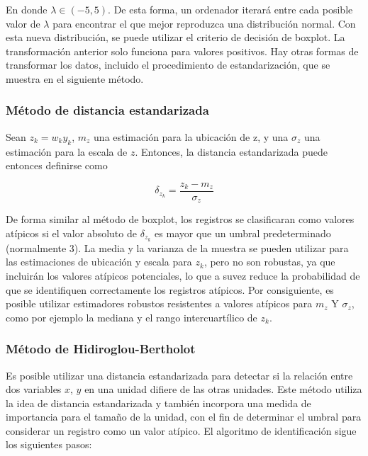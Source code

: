 \documentclass[
  10pt,
  spanish,
]{book}
\begin{document}
En donde \(\lambda\in(-5,5)\). De esta forma, un ordenador iterará entre cada posible valor de \(\lambda\) para encontrar el que mejor reproduzca una distribución normal. Con esta nueva distribución, se puede utilizar el criterio de decisión de boxplot. La transformación anterior solo funciona para valores positivos. Hay otras formas de transformar los datos, incluido el procedimiento de estandarización, que se muestra en el siguiente método.

\hypertarget{muxe9todo-de-distancia-estandarizada}{%
\subsubsection*{Método de distancia estandarizada}\label{muxe9todo-de-distancia-estandarizada}}

Sean \(z_k=w_ky_k\), \(m_z\) una estimación para la ubicación de z, y una \(\sigma_z\) una estimación para la escala de \(z\). Entonces, la distancia estandarizada puede entonces definirse como

\[
\delta_{z_k}=\frac{z_k-m_z}{\sigma_z}
\]

De forma similar al método de boxplot, los registros se clasificaran como valores atípicos si el valor absoluto de \(\delta_{z_k}\) es mayor que un umbral predeterminado (normalmente 3). La media y la varianza de la muestra se pueden utilizar para las estimaciones de ubicación y escala para \(z_k\), pero no son robustas, ya que incluirán los valores atípicos potenciales, lo que a suvez reduce la probabilidad de que se identifiquen correctamente los registros atípicos. Por consiguiente, es posible utilizar estimadores robustos resistentes a valores atípicos para \(m_z\) Y \(\sigma_z\), como por ejemplo la mediana y el rango intercuartílico de \(z_k\).

\hypertarget{muxe9todo-de-hidiroglou-bertholot}{%
\subsubsection*{Método de Hidiroglou-Bertholot}\label{muxe9todo-de-hidiroglou-bertholot}}

Es posible utilizar una distancia estandarizada para detectar si la relación entre dos variables \(x\), \(y\) en una unidad difiere de las otras unidades. Este método utiliza la idea de distancia estandarizada y también incorpora una medida de importancia para el tamaño de la unidad, con el fin de determinar el umbral para considerar un registro como un valor atípico. El algoritmo de identificación sigue los siguientes pasos:
\end{document}
